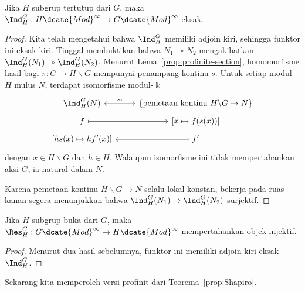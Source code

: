 \begin{lemma}\label{prop:Ind-exact-profinite}
	Jika $H$ subgrup tertutup dari $G$, maka
	$\Ind^G_H:H\dcate{Mod}^\infty\to G\dcate{Mod}^\infty$ eksak.
\end{lemma}
\begin{proof}
	Kita telah mengetahui bahwa $\Ind^G_H$ memiliki adjoin kiri, sehingga
	funktor ini eksak kiri. Tinggal membuktikan bahwa
	$N_1\twoheadrightarrow N_2$ mengakibatkan
	$\Ind^G_H(N_1)\twoheadrightarrow\Ind^G_H(N_2)$. Menurut
	Lema~\ref{prop:profinite-section}, homomorfisme hasil bagi
	$\pi:G\to H\backslash G$ mempunyai penampang kontinu $s$. Untuk setiap
	modul-$H$ mulus $N$, terdapat isomorfisme modul-$\Bbbk$
	\[\begin{tikzcd}[row sep=tiny]
		\Ind^G_H(N) \arrow[leftrightarrow,r,"\sim"] &
		\{\text{pemetaan kontinu }H\backslash G\to N\}\\
		f \arrow[mapsto,r] & {[x\mapsto f(s(x))]}\\
		{[hs(x)\mapsto hf'(x)]} & f' \arrow[mapsto,l]
	\end{tikzcd}\]
	dengan $x\in H\backslash G$ dan $h\in H$. Walaupun isomorfisme ini tidak
	mempertahankan aksi $G$, ia natural dalam $N$.

	Karena pemetaan kontinu $H\backslash G\to N$ selalu lokal konstan, bekerja
	pada ruas kanan segera menunjukkan bahwa
	$\Ind^G_H(N_1)\to\Ind^G_H(N_2)$ surjektif.
\end{proof}

\begin{corollary}\label{prop:Res-injective-profinite}
	Jika $H$ subgrup buka dari $G$, maka
	$\Res^G_H:G\dcate{Mod}^\infty\to H\dcate{Mod}^\infty$
	mempertahankan objek injektif.
\end{corollary}
\begin{proof}
	Menurut dua hasil sebelumnya, funktor ini memiliki adjoin kiri eksak
	$\Ind^G_H$.
\end{proof}

Sekarang kita memperoleh versi profinit dari Teorema~\ref{prop:Shapiro}.

